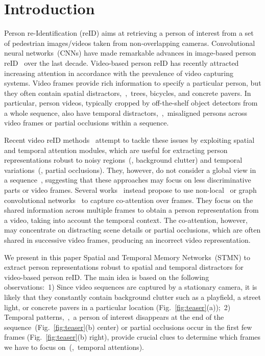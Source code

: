 \documentclass[10pt,twocolumn,letterpaper]{article}
\begin{document}
\section{Introduction}
\vspace{-0.2cm}

Person re-Identification (reID) aims at retrieving a person of interest from a set of pedestrian images/videos taken from non-overlapping cameras. Convolutional neural networks~(CNNs) have made remarkable advances in image-based person reID~\cite{zhao2017spindle,su2017pose,liu2017hydraplus,li2018harmonious,eom2019learning,zheng2019joint} over the last decade. Video-based person reID has recently attracted increasing attention in accordance with the prevalence of video capturing systems. Video frames provide rich information to specify a particular person, but they often contain spatial distractors,~\eg,~trees, bicycles, and concrete pavers. In particular, person videos, typically cropped by off-the-shelf object detectors from a whole sequence, also have temporal distractors,~\eg,~misaligned persons across video frames or partial occlusions within a sequence.

Recent video reID methods~\cite{li2018diversity,fu2019sta} attempt to tackle these issues by exploiting spatial and temporal attention modules, which are useful for extracting person representations robust to noisy regions~(\eg, background clutter) and temporal variations~(\eg, partial occlusions). They, however, do not consider a global view in a sequence~\cite{zhang2020multi,hou2020temporal}, suggesting that these approaches may focus on less discriminative parts or video frames. Several works~\cite{li2019multi,li2019global,liu2019spatially,subramaniam2019co,yan2020learning,yang2020spatial} instead propose to use non-local~\cite{wang2018non} or graph convolutional networks~\cite{kipf2017semi} to capture co-attention over frames. They focus on the shared information across multiple frames to obtain a person representation from a video, taking into account the temporal context. The co-attention, however, may concentrate on distracting scene details or partial occlusions, which are often shared in successive video frames, producing an incorrect video representation.

We present in this paper Spatial and Temporal Memory Networks~(STMN) to extract person representations robust to spatial and temporal distractors for video-based person reID. The main idea is based on the following observations:~1) Since video sequences are captured by a stationary camera, it is likely that they constantly contain background clutter such as a playfield, a street light, or concrete pavers in a particular location (Fig.~\ref{fig:teaser}(a));~2) Temporal patterns,~\eg,~a person of interest disappears at the end of the sequence~(Fig.~\ref{fig:teaser}(b) center) or partial occlusions occur in the first few frames (Fig.~\ref{fig:teaser}(b) right), provide crucial clues to determine which frames we have to focus on~(\ie,~temporal attentions).
\end{document}
